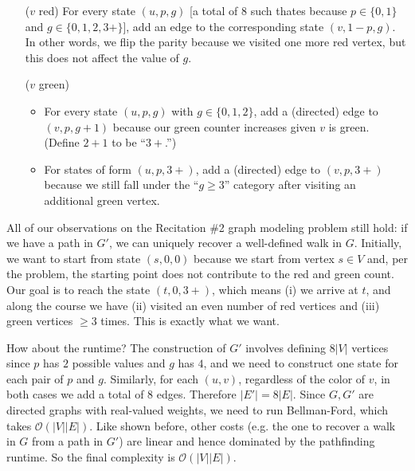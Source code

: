 \begin{solution}
    \begin{enumerate}[label=(\arabic*),align=left]
        \item[($v$ red)] For every state $(u,p,g)$ [a total of $8$ such thates because $p\in \{0,1\}$ and $g \in \{0,1,2,3+\}$], add an edge to the corresponding state $(v,1-p, g)$. In other words, we flip the parity because we visited one more red vertex, but this does not affect the value of $g$.
        \item[($v$ green)]
            \leavevmode
            \begin{itemize}
                \item For every state $(u,p,g)$ with $g\in \{0,1,2\}$, add a (directed) edge to $(v,p,g+1)$ because our green counter increases given $v$ is green. (Define $2+1 $ to be ``$3+$.'')
                \item For states of form $(u,p,3+)$, add a (directed) edge to $(v,p,3+)$ because we still fall under the ``$g\geqslant 3$'' category after visiting an additional green vertex.
            \end{itemize}
    \end{enumerate}

    All of our observations on the Recitation \#2 graph modeling problem still hold: if we have a path in $G'$, we can uniquely recover a well-defined walk in $G$. Initially, we want to start from state $(s,0,0)$ because we start from vertex $s\in V$ and, per the problem, the starting point does not contribute to the red and green count. Our goal is to reach the state $(t,0,3+)$, which means (i) we arrive at $t$, and along the course we have (ii) visited an even number of red vertices and (iii) green vertices $\geqslant 3$ times. This is exactly what we want. 

    How about the runtime? The construction of $G'$ involves defining $8 \lvert V\rvert $ vertices since $p$ has $2$ possible values and $g$ has $4$, and we need to construct one state for each pair of $p$ and $g$. Similarly, for each $(u,v)$, regardless of the color of $v$, in both cases we add a total of $8$ edges. Therefore $\lvert E'\rvert  = 8 \lvert E\rvert $. Since $G, G'$ are directed graphs with real-valued weights, we need to run Bellman-Ford, which takes $\mathcal{O}(\lvert V\rvert \lvert E\rvert )$. Like shown before, other costs (e.g. the one to recover a walk in $G$ from a path in $G'$) are linear and hence dominated by the pathfinding runtime. So the final complexity is $\mathcal{O}(\lvert V\rvert \lvert E\rvert)$.
  \end{solution}


